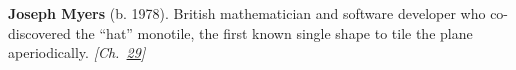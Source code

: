 \textbf{Joseph Myers} (b. 1978). British mathematician and software developer who co-discovered the ``hat'' monotile, the first known single shape to tile the plane aperiodically. \emph{[Ch.~\hyperref[ch:hatmonotile]{29}]}

